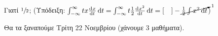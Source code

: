 \documentclass[11pt,a4paper,titlepage,fleqn]{article}
\begin{document}
     Γιατί \( \sfrac{1}{2}  \); (Υπόδειξη: \( 
     \int_{-\infty}^{\infty} tx\od{x}{t}\dif t =
     \int_{-\infty}^{\infty} t \frac{1}{2}\od{x^2}{t}\dif t
     = \left[ \quad \right] - \cancelto{1}{\frac{1}{2}\int x^2\dif t}
      \))
      
    Θα τα ξαναπούμε Τρίτη 22 Νοεμβρίου (χάνουμε 3 μαθήματα).
\end{document}
